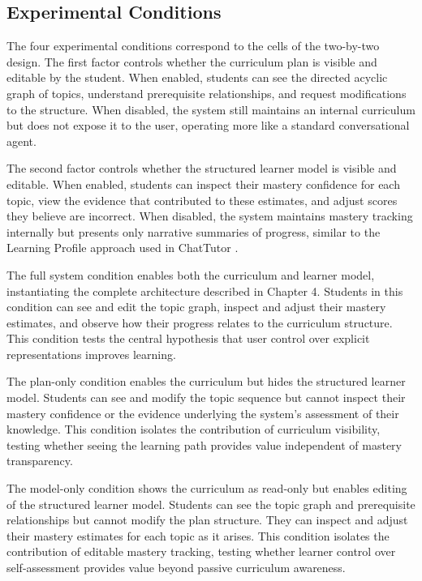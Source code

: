 \documentclass[logo,bsc,singlespacing,parskip,online]{infthesis}
\begin{document}
\subsection{Experimental Conditions}

The four experimental conditions correspond to the cells of the two-by-two design. The first factor controls whether the curriculum plan is visible and editable by the student. When enabled, students can see the directed acyclic graph of topics, understand prerequisite relationships, and request modifications to the structure. When disabled, the system still maintains an internal curriculum but does not expose it to the user, operating more like a standard conversational agent.

The second factor controls whether the structured learner model is visible and editable. When enabled, students can inspect their mastery confidence for each topic, view the evidence that contributed to these estimates, and adjust scores they believe are incorrect. When disabled, the system maintains mastery tracking internally but presents only narrative summaries of progress, similar to the Learning Profile approach used in ChatTutor \citep{chen2024chattutor}.

The full system condition enables both the curriculum and learner model, instantiating the complete architecture described in Chapter 4. Students in this condition can see and edit the topic graph, inspect and adjust their mastery estimates, and observe how their progress relates to the curriculum structure. This condition tests the central hypothesis that user control over explicit representations improves learning.

The plan-only condition enables the curriculum but hides the structured learner model. Students can see and modify the topic sequence but cannot inspect their mastery confidence or the evidence underlying the system's assessment of their knowledge. This condition isolates the contribution of curriculum visibility, testing whether seeing the learning path provides value independent of mastery transparency.

The model-only condition shows the curriculum as read-only but enables editing of the structured learner model. Students can see the topic graph and prerequisite relationships but cannot modify the plan structure. They can inspect and adjust their mastery estimates for each topic as it arises. This condition isolates the contribution of editable mastery tracking, testing whether learner control over self-assessment provides value beyond passive curriculum awareness.
\end{document}
